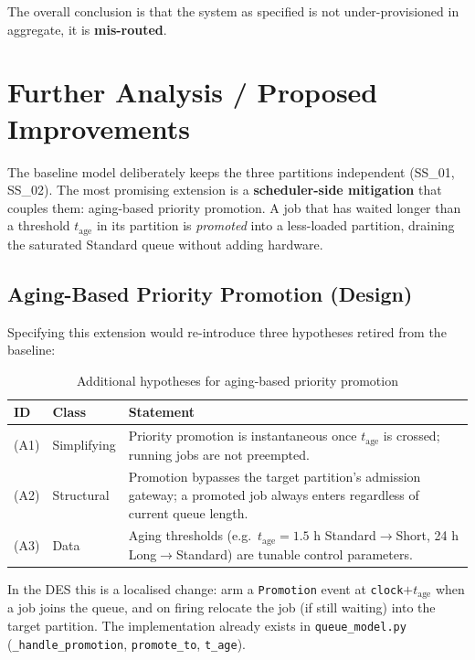 \documentclass[11pt,a4paper]{article}
\begin{document}
The overall conclusion is that the system as specified is not under-provisioned in aggregate, it is
\textbf{mis-routed}.

\section{Further Analysis / Proposed Improvements}
\label{sec:further}

The baseline model deliberately keeps the three partitions independent (SS\_01, SS\_02). The most
promising extension is a \textbf{scheduler-side mitigation} that couples them: aging-based priority
promotion. A job that has waited longer than a threshold $t_\text{age}$ in its partition is
\emph{promoted} into a less-loaded partition, draining the saturated Standard queue without adding
hardware.

\subsection{Aging-Based Priority Promotion (Design)}

Specifying this extension would re-introduce three hypotheses retired from the baseline:

\begin{table}[H]
\centering
\caption{Additional hypotheses for aging-based priority promotion}
\begin{tabularx}{\linewidth}{llX}
\toprule
\textbf{ID} & \textbf{Class} & \textbf{Statement} \\
\midrule
(A1) & Simplifying & Priority promotion is instantaneous once $t_\text{age}$ is crossed; running jobs are not preempted. \\
(A2) & Structural  & Promotion bypasses the target partition's admission gateway; a promoted job always enters regardless of current queue length. \\
(A3) & Data        & Aging thresholds (e.g.\ $t_\text{age} = 1.5$ h Standard$\to$Short, 24 h Long$\to$Standard) are tunable control parameters. \\
\bottomrule
\end{tabularx}
\end{table}

In the DES this is a localised change: arm a \texttt{Promotion} event at \texttt{clock}$+t_\text{age}$
when a job joins the queue, and on firing relocate the job (if still waiting) into the target partition.
The implementation already exists in \texttt{queue\_model.py} (\texttt{\_handle\_promotion},
\texttt{promote\_to}, \texttt{t\_age}).
\end{document}
